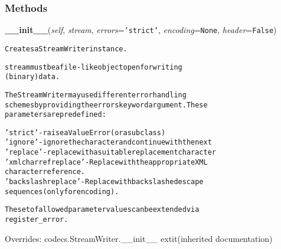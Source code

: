 
  \subsubsection{Methods}

    \vspace{0.5ex}

\hspace{.8\funcindent}\begin{boxedminipage}{\funcwidth}

    \raggedright \textbf{\_\_init\_\_}(\textit{self}, \textit{stream}, \textit{errors}={\tt \texttt{'}\texttt{strict}\texttt{'}}, \textit{encoding}={\tt None}, \textit{header}={\tt False})

\setlength{\parskip}{2ex}
\begin{alltt}
Creates a StreamWriter instance.

stream must be a file-like object open for writing
(binary) data.

The StreamWriter may use different error handling
schemes by providing the errors keyword argument. These
parameters are predefined:

 'strict' - raise a ValueError (or a subclass)
 'ignore' - ignore the character and continue with the next
 'replace'- replace with a suitable replacement character
 'xmlcharrefreplace' - Replace with the appropriate XML
                       character reference.
 'backslashreplace'  - Replace with backslashed escape
                       sequences (only for encoding).

The set of allowed parameter values can be extended via
register\_error.
\end{alltt}

\setlength{\parskip}{1ex}
      Overrides: codecs.StreamWriter.\_\_init\_\_ 	extit{(inherited documentation)}

    \end{boxedminipage}

    \vspace{0.5ex}

